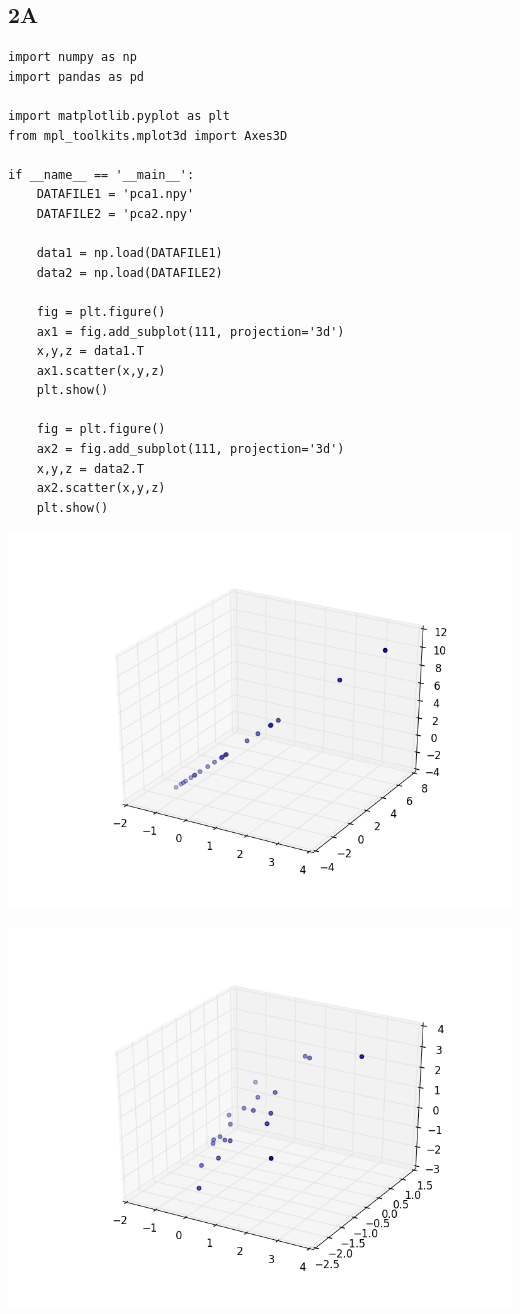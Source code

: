 \documentclass[12pt]{article}
\begin{document}
\begin{flushleft}
		\subsection*{2A}
		
			\begin{lstlisting}
import numpy as np 
import pandas as pd

import matplotlib.pyplot as plt
from mpl_toolkits.mplot3d import Axes3D

if __name__ == '__main__':
	DATAFILE1 = 'pca1.npy'
	DATAFILE2 = 'pca2.npy'
	
	data1 = np.load(DATAFILE1)
	data2 = np.load(DATAFILE2)
	
	fig = plt.figure()
	ax1 = fig.add_subplot(111, projection='3d')
	x,y,z = data1.T
	ax1.scatter(x,y,z)
	plt.show()
	
	fig = plt.figure()
	ax2 = fig.add_subplot(111, projection='3d')
	x,y,z = data2.T
	ax2.scatter(x,y,z)
	plt.show()
			\end{lstlisting}
		
			\includegraphics[scale=0.5]{HW3_2A_0.png}
			\label{fig:graph 2A.1}
			
			\includegraphics[scale=0.5]{HW3_2A_1.png}
			\label{fig:graph 2A.2}
			

\end{flushleft}
\end{document}
